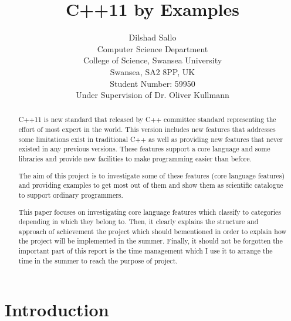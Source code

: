 \documentclass[11pt]{report}
\begin{document}
\author{Dilshad Sallo\\[1ex]
  Computer Science Department\\
  College of Science, Swansea University\\
  Swansea, SA2 8PP, UK\\[1ex]
  Student Number: 59950\\
  Under Supervision of Dr. Oliver Kullmann
}

\title{C++11 by Examples}

\maketitle



\begin{abstract}

C++11 is new standard that released by C++ committee standard \linebreak representing the effort of most expert in the world. This version includes new features that addresses some limitations exist in traditional C++ as well as \linebreak providing new features that never existed in any previous versions. These \linebreak features support a core language and some libraries and  provide new facilities  to make programming easier than before.

The aim of this project is to investigate some of these features (core \linebreak language features) and providing examples to get most out of them and show them as scientific catalogue to support  ordinary programmers.

This paper focuses on investigating core language features which classify to categories depending in which they belong to. Then, it clearly explains the structure  and  approach of achievement the project which should be\linebreak mentioned in order to explain how the project will be implemented in the \linebreak summer. Finally, it should not be forgotten the important part of this \linebreak report is the time management which  I use it to arrange the time in the summer to reach the purpose of project.
\end{abstract}

\tableofcontents


\chapter{Introduction}
\label{cha:Introduction}
\end{document}
